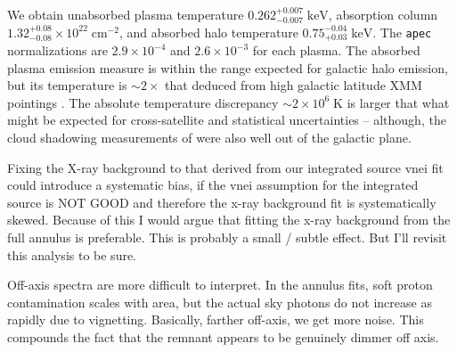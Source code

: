 \documentclass[preprint2,tighten,trackchanges]{aastex6}
\newcommand*{\mt}{\mathrm}
\newcommand*{\unit}[1]{\;\mt{#1}}  %
\newcommand*{\abt}{\mathord{\sim}} %
\begin{document}
%
%
%
%
%

We obtain unabsorbed plasma temperature ${0.262}^{+0.007}_{-0.007} \unit{keV}$,
absorption column ${1.32}^{+0.08}_{-0.08} \times 10^{22} \unit{cm^{-2}}$,
and absorbed halo temperature ${0.75}^{-0.04}_{+0.03} \unit{keV}$.
The \texttt{apec} normalizations are $2.9\times10^{-4}$ and $2.6\times10^{-3}$
for each plasma.  %
The absorbed plasma emission measure is within the range expected for galactic
halo emission, but its temperature is $\abt 2\times$ that deduced from high
galactic latitude XMM pointings \citep{henley2013}.
The absolute temperature discrepancy $\abt 2 \times 10^6 \unit{K}$
is larger that what might be expected for cross-satellite and statistical
uncertainties \citep{henley2015} -- although, the cloud shadowing measurements
of \citet{henley2015} were also well out of the galactic plane.

Fixing the X-ray background to that derived from our integrated source vnei fit
could introduce a systematic bias, if the vnei assumption for the integrated
source is NOT GOOD and therefore the x-ray background fit is systematically
skewed.
Because of this I would argue that fitting the x-ray background from the full
annulus is preferable.
This is probably a small / subtle effect.
But I'll revisit this analysis to be sure.

Off-axis spectra are more difficult to interpret.
In the annulus fits, soft proton contamination scales with area,
but the actual sky photons do not increase as rapidly due to vignetting.
Basically, farther off-axis, we get more noise.
This compounds the fact that the remnant appears to be genuinely dimmer off
axis.
\end{document}
